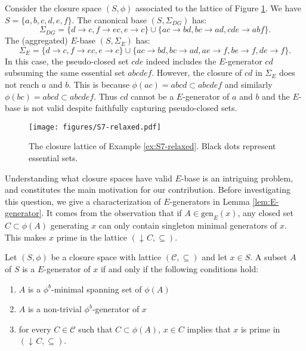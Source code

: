 \documentclass[12pt, a4paper]{article}
\def\FIGSrelaxed{1.05}  %
\newcommand{\cc}[1]{\mathcal{#1}}  %
\newcommand{\U}{S}  %
\DeclareMathOperator{\idl}{\downarrow\!}  %
\newcommand{\cl}{\phi}  %
\newcommand{\cs}{\cc{C}} %
\newcommand{\gen}{\mathrm{gen}}  %
\newcommand{\imp}{\rightarrow}  %
\newcommand{\is}{\Sigma}  %
\begin{document}
\begin{example} \label{ex:S7-relaxed}
Consider the closure space $(\U, \cl)$ associated to the lattice of Figure \ref{fig:S7-relaxed}.
We have $\U = \{a, b, c, d, e, f\}$.
The canonical base $(\U, \is_{DG})$ has:
%
\[ 
\is_{DG} = \{d \imp c, f \imp ec, e \imp c\} \cup \{ac \imp bd, bc \imp ad, cde \imp ab\!f\}.
\]
%
The (aggregated) $E$-base $(\U, \is_E)$ has:
%
\[ 
\is_{E} = \{d \imp c, f \imp ec, e \imp c\} \cup \{ac \imp bd, bc \imp ad, ae \imp f, be \imp f, de \imp f\}.
\]
%
In this case, the pseudo-closed set $cde$ indeed includes the $E$-generator $cd$ subsuming the same essential set $abcdef$.
However, the closure of $cd$ in $\is_E$ does not reach $a$ and $b$.
This is because $\cl(ac) = abcd \subset abcdef$ and similarly $\cl(bc) = abcd \subset abcdef$.
Thus $cd$ cannot be a $E$-generator of $a$ and $b$ and the $E$-base is not valid despite faithfully capturing pseudo-closed sets.
%
\begin{figure}[ht!]
    \centering
    \texttt{[image: figures/S7-relaxed.pdf]}%
    \caption{The closure lattice of Example \ref{ex:S7-relaxed}.
    Black dots represent essential sets.}
    \label{fig:S7-relaxed}
\end{figure}
%
\end{example}

Understanding what closure spaces have valid $E$-base is an intriguing problem, and constitutes the main motivation for our contribution.
Before investigating this question, we give a characterization of $E$-generators in Lemma \ref{lem:E-generator}.
It comes from the observation that if $A \in \gen_E(x)$, any closed set $C \subset \cl(A)$ generating $x$ can only contain singleton minimal generators of $x$.
This makes $x$ prime in the lattice $(\idl C, \subseteq)$.

\begin{lemma} \label{lem:E-generator}
Let $(\U, \cl)$ be a closure space with lattice $(\cs, \subseteq)$ and let $x \in \U$.
A subset $A$ of $\U$ is a $E$-generator of $x$ if and only if the following conditions hold:
\begin{enumerate}[(1)]
    \item $A$ is a $\cl^b$-minimal spanning set of $\cl(A)$
    \item $A$ is a non-trivial $\cl^b$-generator of $x$
    \item for every $C \in \cs$ such that $C \subset \cl(A)$, $x \in C$ implies that $x$ is prime in $(\idl C, \subseteq)$.
\end{enumerate}
\end{lemma}
\end{document}
